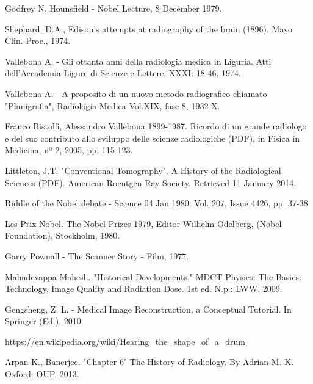 \documentclass[a4paper,12pt, doubleside]{report}
\begin{document}
\newpage
\begin{thebibliography}{1}
    
        Godfrey N. Hounsfield - Nobel Lecture, 8 December 1979.
    
        Shephard, D.A., Edison's attempts at radiography of the brain (1896), Mayo Clin. Proc., 1974.
    
        Vallebona A. - Gli ottanta anni della radiologia medica in Liguria. Atti dell’Accademia Ligure di Scienze e Lettere, XXXI: 18-46, 1974.
      
        Vallebona A. - A proposito di un nuovo metodo radiografico chiamato "Planigrafia", Radiologia Medica Vol.XIX, fase 8, 1932-X.
    
        Franco Bistolfi, Alessandro Vallebona 1899-1987. Ricordo di un grande radiologo e del suo contributo allo sviluppo delle scienze radiologiche (PDF), in Fisica in Medicina, nº 2, 2005, pp. 115-123.  
    
        Littleton, J.T. "Conventional Tomography". A History of the Radiological Sciences (PDF). American Roentgen Ray Society. Retrieved 11 January 2014.
    
        Riddle of the Nobel debate - Science 04 Jan 1980: Vol. 207, Issue 4426, pp. 37-38
    
        Les Prix Nobel. The Nobel Prizes 1979, Editor Wilhelm Odelberg, (Nobel Foundation), Stockholm, 1980. 
    
        Garry Pownall - The Scanner Story - Film, 1977.
    
        Mahadevappa Mahesh. "Historical Developments." MDCT Physics: The Basics: Technology, Image Quality and Radiation Dose. 1st ed. N.p.: LWW, 2009.
    
        Gengsheng, Z. L. - Medical Image Reconstruction, a Conceptual Tutorial. In Springer (Ed.), 2010.
    
        \url{https://en.wikipedia.org/wiki/Hearing_the_shape_of_a_drum}
    
        Arpan K., Banerjee. "Chapter 6" The History of Radiology. By Adrian M. K. Oxford: OUP, 2013.
        

\end{thebibliography}
\end{document}
